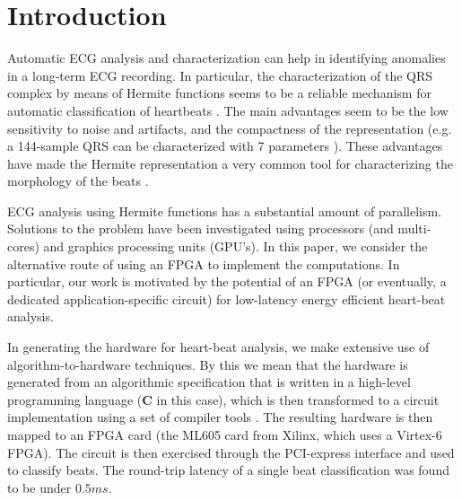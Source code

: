 \documentclass[runningheads]{llncs}
\begin{document}
\section{Introduction}

Automatic ECG analysis and characterization can help in 
identifying anomalies in a long-term ECG recording. 
In particular, the characterization of the QRS complex by means of Hermite functions 
seems to be a reliable mechanism  for automatic classification of heartbeats \cite{j:lagerholm00}. 
The main advantages seem to be the low sensitivity to noise and artifacts, and the
compactness of the representation (e.g. a 144-sample QRS can be characterized with 7 parameters \cite{c:marquez13}). 
These advantages have made the Hermite representation a very common tool for characterizing the 
morphology of the beats \cite{j:lagerholm00,c:marquez13,c:braccini97,j:linh03a,j:linh03b}. 

ECG analysis using Hermite functions has a
substantial amount of parallelism.  Solutions to the problem have been investigated
using processors (and multi-cores) and graphics processing units (GPU's). 
In this paper, we consider the alternative route of using an FPGA to implement
the computations.  In particular, our work is motivated by the potential
of an FPGA (or eventually, a dedicated application-specific circuit) for low-latency
energy efficient heart-beat analysis.  

In generating the hardware for heart-beat analysis, we make extensive use of
algorithm-to-hardware techniques.  By this we mean that the hardware is
generated from an algorithmic specification that is written in a
high-level programming language ({\bf C} in this case), which is then
transformed to a circuit implementation using a set of compiler tools \cite{c:ahir_thesis2009,c:ahir_dsd2010,c:ahir_usenix2012}.
The resulting hardware is then mapped to an FPGA card (the ML605 card from Xilinx,
which uses a Virtex-6 FPGA).  The circuit is then exercised through the PCI-express 
interface and used to classify beats.  The round-trip latency of a single
beat classification was found to be under $0.5ms$.

\end{document}

